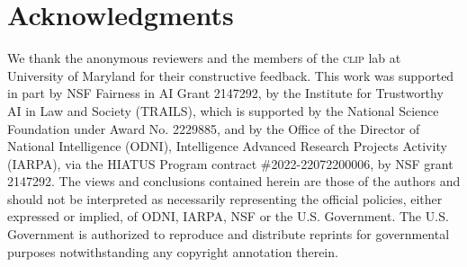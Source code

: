 \section*{Acknowledgments}

We thank the anonymous reviewers and the members of the \textsc{clip} lab at University of Maryland for their constructive feedback. This work was supported in part by NSF Fairness in AI Grant 2147292, by the Institute for Trustworthy AI in Law and Society (TRAILS), which is supported by the National Science Foundation under Award No. 2229885, and by the Office of the Director of National Intelligence (ODNI), Intelligence Advanced Research Projects Activity (IARPA), via the HIATUS Program contract \#2022-22072200006, by NSF grant 2147292. The views and conclusions contained herein are those of the authors and should not be interpreted as necessarily representing the official policies, either expressed or implied, of ODNI, IARPA, NSF or the U.S. Government. The U.S. Government is authorized to reproduce and distribute reprints for governmental purposes notwithstanding any copyright annotation therein.